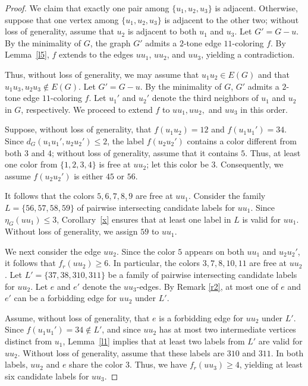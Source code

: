 \documentclass[10pt,a4paper]{amsart}
\begin{document}
\begin{proof}
\noindent We claim that exactly one pair among $\{u_1,u_2,u_3\}$ is adjacent. Otherwise, suppose that one vertex among $\{u_1,u_2,u_3\}$ is adjacent to the other two; without loss of generality, assume that $u_2$ is adjacent to both $u_1$ and $u_3$. Let $G'=G-u$. By the minimality of $G$, the graph $G'$ admits a $2$-tone edge $11$-coloring $f$. By Lemma~\ref{l5}, $f$ extends to the edges $uu_1$, $uu_2$, and $uu_3$, yielding a contradiction.

\noindent Thus, without loss of generality, we may assume that $u_1u_2\in E(G)$ and that $u_1u_3,u_2u_3\notin E(G)$. Let $G' = G - u$. By the minimality of $G$, $G'$ admits a $2$-tone edge $11$-coloring $f$. Let $u_1'$ and $u_2'$ denote the third neighbors of $u_1$ and $u_2$ in $G$, respectively. We proceed to extend $f$ to $uu_1, uu_2,$ and $uu_3$ in this order.

\noindent Suppose, without loss of generality, that $f(u_1u_2)=12$ and $f(u_1u_1')=34$. Since $d_G(u_1u_1',u_2u_2')\le2$, the label $f(u_2u_2')$ contains a color different from both $3$ and $4$; without loss of generality, assume that it contains $5$. Thus, at least one color from $\{1,2,3,4\}$ is free at $uu_2$; let this color be $3$. Consequently, we assume $f(u_2u_2')$ is either $45$ or $56$.

\noindent It follows that the colors $5,6,7,8,9$ are free at $uu_1$. Consider the family $L=\{56, 57, 58, 59\}$ of pairwise intersecting candidate labels for $uu_1$. Since $\eta_G(uu_1)\le 3$, Corollary~\ref{x} ensures that at least one label in $L$ is valid for $uu_1$. Without loss of generality, we assign $59$ to $uu_1$.

\noindent We next consider the edge $uu_2$. Since the color $5$ appears on both $uu_1$ and $u_2u_2'$, it follows that $f_r(uu_2)\ge 6$. In particular, the colors $3,7,8,10,11$ are free at $uu_2$. Let $L'=\{37,38,310,311\}$ be a family of pairwise intersecting candidate labels for $uu_2$. Let $e$ and $e'$ denote the $uu_3$-edges. By Remark \ref{r2}, at most one of $e$ and $e'$ can be a forbidding edge for $uu_2$ under $L'$.

\noindent Assume, without loss of generality, that $e$ is a forbidding edge for $uu_2$ under $L'$. Since $f(u_1u_1')=34 \notin L'$, and since $uu_2$ has at most two intermediate vertices distinct from $u_1$, Lemma~\ref{l1} implies that at least two labels from $L'$ are valid for $uu_2$. Without loss of generality, assume that these labels are $310$ and $311$. In both labels, $uu_2$ and $e$ share the color $3$. Thus, we have $f_r(uu_3) \ge 4$, yielding at least six candidate labels for $uu_3$.


\end{proof}
\end{document}
